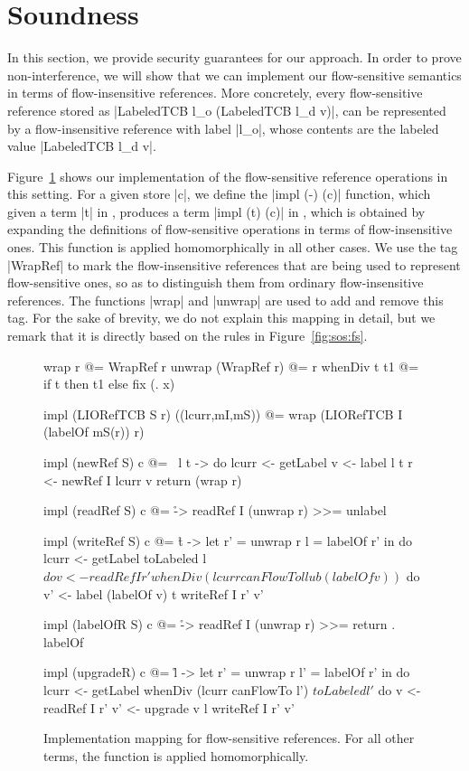 \section{Soundness}
\label{sec:soundness}

In this section, we provide security guarantees for our approach. In
order to prove non-interference, we will show that we can implement
our flow-sensitive semantics in terms of flow-insensitive
references. More concretely, every flow-sensitive reference stored as
|LabeledTCB l_o (LabeledTCB l_d v)|, can be represented by a
flow-insensitive reference with label |l_o|, whose contents are the
labeled value |LabeledTCB l_d v|.

Figure~\ref{fig:fs-exts-semantics-impl} shows our implementation of
the flow-sensitive reference operations in this setting.  For a given
store |c|, we define the |impl (-) (c)| function, which given a term
|t| in \liofs{}, produces a term |impl (t) (c)| in \lio{}, which is
obtained by expanding the definitions of flow-sensitive operations in
terms of flow-insensitive ones. This function is applied
homomorphically in all other cases. We use the tag |WrapRef| to mark
the flow-insensitive references that are being used to represent
flow-sensitive ones, so as to distinguish them from ordinary
flow-insensitive references. The functions |wrap| and |unwrap| are
used to add and remove this tag. For the sake of brevity, we do not
explain this mapping in detail, but we remark that it is directly
based on the rules in Figure~\ref{fig:sos:fs}.

\begin{figure}
\small
\begin{code}
wrap r @= WrapRef r
unwrap (WrapRef r) @= r
whenDiv t t1 @= if t then t1 else fix (\x. x)

impl (LIORefTCB S r) ((lcurr,mI,mS)) @= wrap (LIORefTCB I (labelOf mS(r)) r)

impl (newRef S) c @= \ l t -> do
  lcurr  <- getLabel
  v      <- label l t
  r      <- newRef I lcurr v
  return (wrap r)


impl (readRef S) c @= \r -> readRef I (unwrap r) >>= unlabel


impl (writeRef S) c @= \r t -> let  r'  = unwrap r
                                    l   = labelOf r' in do
  lcurr <- getLabel
  toLabeled l $ do
     v   <- readRef I r'
     whenDiv (lcurr canFlowTo l lub (labelOf v)) $ do
       v'  <- label (labelOf v) t
       writeRef I r' v'


impl (labelOfR S) c @= \r -> readRef I (unwrap r) >>= return . labelOf

impl (upgradeR) c @= \r l -> let  r'  = unwrap r
                                  l'  = labelOf r' in do
  lcurr <- getLabel
  whenDiv (lcurr canFlowTo l') $ toLabeled l' $ do
     v   <- readRef I r'
     v'  <- upgrade v l
     writeRef I r' v'

\end{code}
\caption{Implementation mapping for flow-sensitive references. For all other terms, the function is applied homomorphically.\label{fig:fs-exts-semantics-impl}}
\end{figure}

